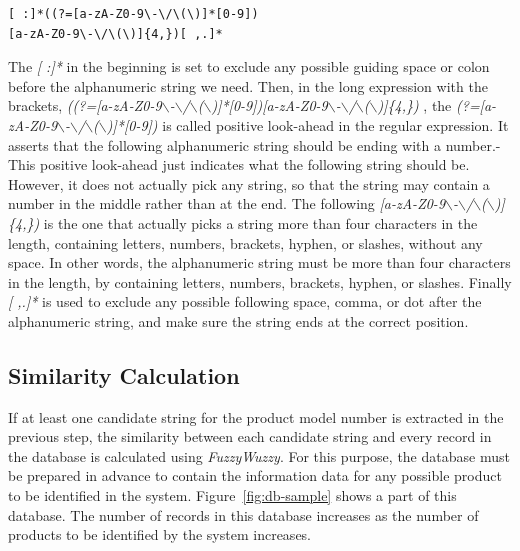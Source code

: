\documentclass[technicalreport]{ieicej}
\begin{document}
            \begin{center}
            \begin{BVerbatim}
[ :]*((?=[a-zA-Z0-9\-\/\(\)]*[0-9])
[a-zA-Z0-9\-\/\(\)]{4,})[ ,.]*
            \end{BVerbatim}
            \end{center}
    
The {\em [ :]*} in the beginning is set to exclude any possible guiding space or colon before the alphanumeric string we need. Then, in the long expression with the brackets, {\em ((?=[a-zA-Z0-9$\backslash$-$\backslash$/$\backslash$($\backslash$)]*[0-9])[a-zA-Z0-9$\backslash$-$\backslash$/$\backslash$($\backslash$)]\{4,\}) }, the {\em (?=[a-zA-Z0-9$\backslash$-$\backslash$/$\backslash$($\backslash$)]*[0-9])} is called positive look-ahead in the regular expression. It asserts that the following alphanumeric string should be ending with a number.\cite{lookahead}-\cite{regex-tutorial} This positive look-ahead just indicates what the following string should be. However, it does not actually pick any string, so that the string may contain a number in the middle rather than at the end. The following {\em [a-zA-Z0-9$\backslash$-$\backslash$/$\backslash$($\backslash$)]\{4,\})} is the one that actually picks a string more than four characters in the length, containing letters, numbers, brackets, hyphen, or slashes, without any space.
In other words, the alphanumeric string must be more than four characters in the length, by containing letters, numbers, brackets, hyphen, or slashes.
Finally {\em [ ,.]*} is used to exclude any possible following space, comma, or dot after the alphanumeric string, and make sure the string ends at the correct position.

        
\subsection{Similarity Calculation}
    If at least one candidate string for the product model number is extracted in the previous step, the similarity between each candidate string and every record in the database is calculated using {\em FuzzyWuzzy}. For this purpose, the database must be prepared in advance to contain the information data for any possible product to be identified in the system. Figure~\ref{fig:db-sample} shows a part of this database. The number of records in this database increases as the number of products to be identified by the system increases.
\end{document}

